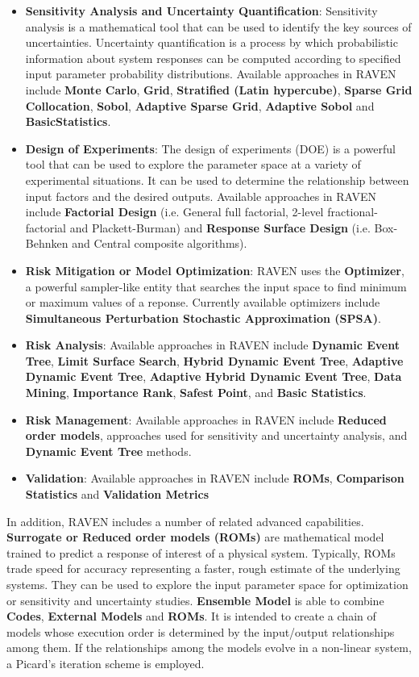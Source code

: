 \begin{itemize}
  \item \textbf{Sensitivity Analysis and Uncertainty Quantification}: Sensitivity analysis is a mathematical tool
    that can be used to identify the key sources of uncertainties. Uncertainty quantification is a process by which
    probabilistic information about system responses can be computed according to specified input parameter probability
    distributions. Available approaches in RAVEN include \textbf{Monte Carlo}, \textbf{Grid}, \textbf{Stratified (Latin hypercube)},
    \textbf{Sparse Grid Collocation}, \textbf{Sobol}, \textbf{Adaptive Sparse Grid}, \textbf{Adaptive Sobol} and
    \textbf{BasicStatistics}.
  \item \textbf{Design of Experiments}: The design of experiments (DOE) is a powerful tool that can be used to explore the
    parameter space at a variety of experimental situations. It can be used to determine the relationship between
    input factors and the desired outputs. Available approaches in RAVEN include \textbf{Factorial Design}
    (i.e. General full factorial, 2-level fractional-factorial and Plackett-Burman) and \textbf{Response Surface Design}
    (i.e. Box-Behnken and Central composite algorithms).
  \item \textbf{Risk Mitigation or Model Optimization}: RAVEN uses the \textbf{Optimizer}, a powerful sampler-like entity that searches
    the input space to find minimum or maximum values of a reponse. Currently available optimizers include
    \textbf{Simultaneous Perturbation Stochastic Approximation (SPSA)}.
  \item \textbf{Risk Analysis}: Available approaches in RAVEN include \textbf{Dynamic Event Tree}, \textbf{Limit Surface Search},
    \textbf{Hybrid Dynamic Event Tree}, \textbf{Adaptive Dynamic Event Tree}, \textbf{Adaptive Hybrid Dynamic Event Tree},
    \textbf{Data Mining}, \textbf{Importance Rank}, \textbf{Safest Point}, and \textbf{Basic Statistics}.
  \item \textbf{Risk Management}: Available approaches in RAVEN include \textbf{Reduced order models},
    approaches used for sensitivity and uncertainty analysis, and \textbf{Dynamic Event Tree} methods.
  \item \textbf{Validation}: Available approaches in RAVEN include \textbf{ROMs}, \textbf{Comparison Statistics} and \textbf{Validation Metrics}
\end{itemize}

In addition, RAVEN includes a number of related advanced capabilities. \textbf{Surrogate or Reduced order models (ROMs)} are mathematical
model trained to predict a response of interest of a physical system. Typically, ROMs trade speed for accuracy representing
a faster, rough estimate of the underlying systems. They can be used to explore the input parameter space for optimization
or sensitivity and uncertainty studies. \textbf{Ensemble Model} is able to combine \textbf{Codes}, \textbf{External Models}
and \textbf{ROMs}. It is intended to create a chain of models whose execution order is determined by the input/output
relationships among them. If the relationships among the models evolve in a non-linear system, a Picard's iteration scheme is
employed.

